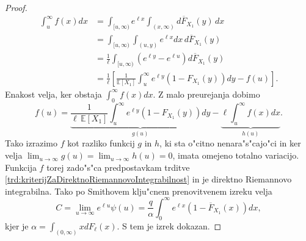 \documentclass[12pt, a4paper, reqno]{amsart}
\theoremstyle{definition}
\theoremstyle{plain}
\newcommand{\E}{\mathbb{E}}
\newcommand{\1}{\mathds{1}}
\newcommand*{\refPriloga}[1]{%
  \begingroup
    \hypersetup{
      linkcolor=red,
      linkbordercolor=red,
    }%
    \ref{#1}%
  \endgroup
}
\begin{document}
\begin{proof}
                \begin{align*}
                    \int_u^\infty f(x) dx 
                    &= \int_{[u, \infty)}e^{\ell x}\int_{(x, \infty)}d\overline{F}_{X_1}(y)\,dx \\
                    &= \int_{[u, \infty)}\int_{(u, y)}e^{\ell x}dx\,d\overline{F}_{X_1}(y) \\
                    &= \frac{1}{\ell}\int_{[u, \infty)}\left(e^{\ell y} - e^{\ell u}\right)d\overline{F}_{X_1}(y) \\
                    &= \frac{1}{\ell}\left[\frac{1}{\E\left[X_1\right]}\int_u^\infty e^{\ell y}\left(1 - F_{X_1}(y)\right)dy - f(u)\right].
                \end{align*}
                Enakost velja, ker obstaja $\int_0^\infty f(x)dx$.
                Z malo preurejanja dobimo 
                \begin{equation*}
                    f(u) = \underbrace{\frac{1}{\ell\,\E\left[X_1\right]}\int_u^\infty e^{\ell y}\left(1 - F_{X_1}(y)\right)dy}_{g(u)} - \underbrace{\ell\int_u^\infty f(x) dx}_{h(u)}. 
                \end{equation*}
                Tako izrazimo $f$ kot razliko funkcij $g$ in $h$, ki sta o"citno nenara"s"cajo"ci in ker velja 
                $\lim_{u\to\infty}g(u) = \lim_{u\to\infty}h(u) = 0$, imata omejeno totalno variacijo.
                Funkcija $f$ torej zado"s"ca predpostavkam trditve \refPriloga{trd:kriterijZaDirektnoRiemannovoIntegrabilnost} in 
                je direktno Riemannovo integrabilna. 
                Tako po Smithovem klju"cnem prenovitvenem izreku velja
                \begin{equation}
                    C = \lim_{u\to\infty}e^{\ell u}\psi(u) =  \frac{q}{\alpha} \int_0^\infty e^{\ell x}(1 - \overline{F}_{X_1}(x))dx,
                    \label{eq:CramerBoundConstant}
                \end{equation}
                kjer je $\alpha = \int_{(0, \infty)}x dF_\ell(x)$. S tem je izrek dokazan.
            \end{proof}
\end{document}
